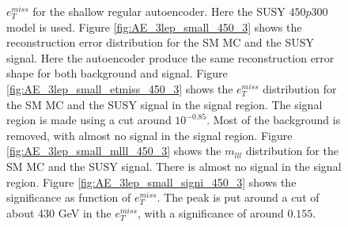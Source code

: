 \begin{figure}[H]
{    $e_T^{miss}$ for the shallow regular autoencoder. Here the SUSY $450p300$ model is used. 
    Figure \ref{fig:AE_3lep_small_450_3} shows the reconstruction error 
    distribution for the SM MC and the SUSY signal. Here the autoencoder produce the same reconstruction error shape for both background and 
    signal. Figure \ref{fig:AE_3lep_small_etmiss_450_3} shows the $e_T^{miss}$ distribution for the SM MC and the SUSY signal in the signal region. 
    The signal region is made using a cut around $10^{-0.85}$. Most of the background is removed, with almost no signal in the signal region.
    Figure \ref{fig:AE_3lep_small_mlll_450_3} shows the $m_{lll}$ distribution for the SM MC and the SUSY signal. 
    There is almost no signal in the signal region. Figure \ref{fig:AE_3lep_small_signi_450_3} shows the significance as function of
    $e_T^{miss}$. The peak is put around a cut of about 430 GeV in the $e_T^{miss}$, with a significance of around $0.155$.}
    \label{fig:AE_3lep_small_rec_sig_signi_450_3}
\end{figure}








